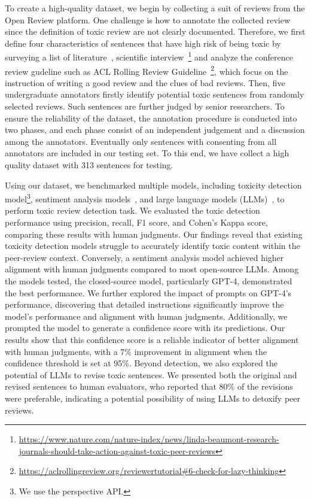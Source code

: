 To create a high-quality dataset, we begin by collecting a suit of reviews from the Open Review platform. 
One challenge is how to annotate the collected review since the definition of toxic review are not clearly documented. 
Therefore, we first define four characteristics of sentences that have high risk of being toxic by surveying a list of literature~\citep{silbiger2019unprofessional,mavrogenis2019evaluate,rogers2020can}, scientific interview~\footnote{\url{https://www.nature.com/nature-index/news/linda-beaumont-research-journals-should-take-action-against-toxic-peer-reviews}} and analyze the conference review gudeline such as ACL Rolling Review Guideline~\footnote{\url{https://aclrollingreview.org/reviewertutorial#6-check-for-lazy-thinking}},  which focus on the instruction of writing a good review and the clues of bad reviews. 
Then, five undergraduate annotators firstly identify potential toxic sentences from randomly selected reviews. 
Such sentences are further judged by senior researchers. 
To ensure the reliability of the dataset, the annotation procedure is conducted into two phases, and each phase consist of an independent judgement and a discussion among the annotators. Eventually only sentences with consenting from all annotators are included in our testing set. 
To this end, we have collect a high quality dataset with 313 sentences for testing. 

Using our dataset, we benchmarked multiple models, including toxicity detection model\footnote{We use the perspective API.}, sentiment analysis models~\cite{sanh2019distilbert}, and large language models (LLMs)~\cite{jiang2023mistral,touvron2023llama}, to perform toxic review detection task. We evaluated the toxic detection performance using precision, recall, F1 score, and Cohen's Kappa score, comparing these results with human judgments.
Our findings reveal that existing toxicity detection models struggle to accurately identify toxic content within the peer-review context. Conversely, a sentiment analysis model achieved higher alignment with human judgments compared to most open-source LLMs. Among the models tested, the closed-source model, particularly GPT-4, demonstrated the best performance. We further explored the impact of prompts on GPT-4's performance, discovering that detailed instructions significantly improve the model's performance and alignment with human judgments.
Additionally, we prompted the model to generate a confidence score with its predictions. Our results show that this confidence score is a reliable indicator of better alignment with human judgments, with a 7\% improvement in alignment when the confidence threshold is set at 95\%.
Beyond detection, we also explored the potential of LLMs to revise toxic sentences. We presented both the original and revised sentences to human evaluators, who reported that 80\% of the revisions were preferable, indicating a potential possibility of using LLMs to detoxify peer reviews.

